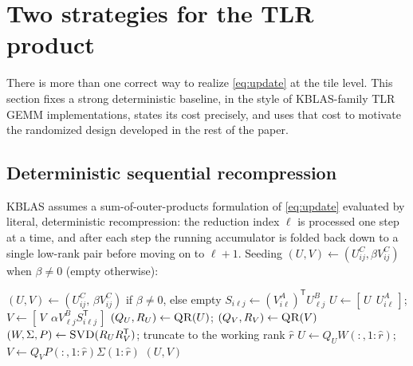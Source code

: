 \documentclass[11pt]{article}
\newcommand{\T}{\mathsf{T}}
\begin{document}
\section{Two strategies for the TLR product}
\label{sec:strategies}

There is more than one correct way to realize \eqref{eq:update} at the tile
level. This section fixes a strong deterministic baseline, in the style of
KBLAS-family TLR GEMM implementations, states its cost precisely, and uses
that cost to motivate the randomized design developed in the rest of the
paper.

\subsection{Deterministic sequential recompression}
\label{sec:kblas}

KBLAS assumes a sum-of-outer-products formulation of \eqref{eq:update}
evaluated by literal, deterministic recompression: the reduction index $\ell$
is processed one step at a time, and after each step the running accumulator
is folded back down to a single low-rank pair before moving on to $\ell+1$.
Seeding $(U,V)\gets(U^C_{ij},\beta V^C_{ij})$ when $\beta\ne0$ (empty
otherwise):

\begin{algorithm}[H]
\caption{Deterministic sequential recompression, one output tile
(KBLAS-style)}
\label{alg:kblas}
\begin{algorithmic}[1]
  \State $(U,V)\gets(U^C_{ij},\,\beta V^C_{ij})$ if $\beta\ne0$, else empty
     \State $S_{i\ell j}\gets(V^A_{i\ell})^{\T}U^B_{\ell j}$
     \State $U\gets[\,U\ \ U^A_{i\ell}\,]$;\quad
            $V\gets[\,V\ \ \alpha V^B_{\ell j}S_{i\ell j}^{\T}\,]$
     \State $(Q_U,R_U)\gets\textsc{QR}(U)$;\quad
            $(Q_V,R_V)\gets\textsc{QR}(V)$
     \State $(W,\Sigma,P)\gets\textsc{SVD}(R_UR_V^{\T})$; truncate to the
            working rank $\hat r$
     \State $U\gets Q_UW(:,1{:}\hat r)$;\quad
            $V\gets Q_VP(:,1{:}\hat r)\Sigma(1{:}\hat r)$
  \EndFor
  \State \Return $(U,V)$
\EndProcedure
\end{algorithmic}
\end{algorithm}
\end{document}
